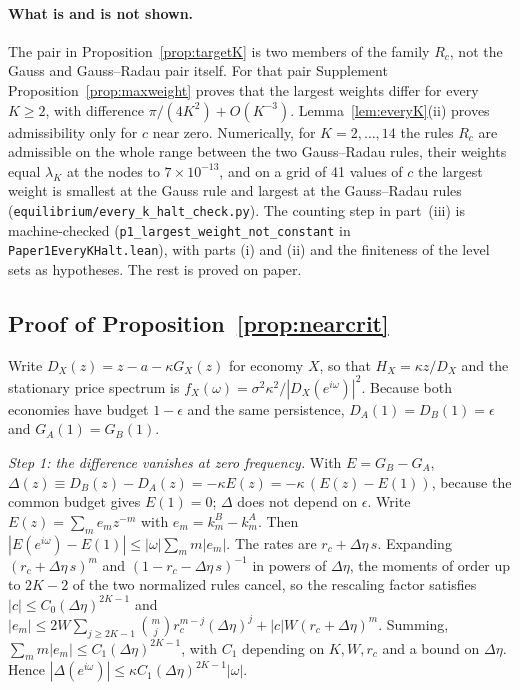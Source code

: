 \documentclass[12pt]{article}
\theoremstyle{definition}
\theoremstyle{remark}
\begin{document}
\paragraph{What is and is not shown.} The pair in Proposition~\ref{prop:targetK} is two members of the family $R_c$, not the Gauss and Gauss--Radau pair itself. For that pair Supplement Proposition~\ref{prop:maxweight} proves that the largest weights differ for every $K\ge2$, with difference $\pi/(4K^2)+O(K^{-3})$. Lemma~\ref{lem:everyK}(ii) proves admissibility only for $c$ near zero. Numerically, for $K=2,\ldots,14$ the rules $R_c$ are admissible on the whole range between the two Gauss--Radau rules, their weights equal $\lambda_K$ at the nodes to $7\times10^{-13}$, and on a grid of 41 values of $c$ the largest weight is smallest at the Gauss rule and largest at the Gauss--Radau rules (\nolinkurl{equilibrium/every_k_halt_check.py}). The counting step in part~(iii) is machine-checked (\texttt{p1\_largest\_weight\_not\_constant} in \nolinkurl{Paper1EveryKHalt.lean}), with parts (i) and (ii) and the finiteness of the level sets as hypotheses. The rest is proved on paper.


\subsection{Proof of Proposition~\ref{prop:nearcrit}}\label{app:nearcrit}

Write $D_X(z)=z-a-\kappa G_X(z)$ for economy $X$, so that $H_X=\kappa z/D_X$ and the stationary price spectrum is $f_X(\omega)=\sigma^2\kappa^2/|D_X(e^{i\omega})|^2$. Because both economies have budget $1-\epsilon$ and the same persistence, $D_A(1)=D_B(1)=\epsilon$ and $G_A(1)=G_B(1)$.

\emph{Step 1: the difference vanishes at zero frequency.} With $E=G_B-G_A$, $\Delta(z)\equiv D_B(z)-D_A(z)=-\kappa E(z)=-\kappa\,(E(z)-E(1))$, because the common budget gives $E(1)=0$; $\Delta$ does not depend on $\epsilon$. Write $E(z)=\sum_me_mz^{-m}$ with $e_m=k^B_m-k^A_m$. Then $|E(e^{i\omega})-E(1)|\le|\omega|\sum_mm|e_m|$. The rates are $r_c+\Delta\eta\,s$. Expanding $(r_c+\Delta\eta\,s)^m$ and $(1-r_c-\Delta\eta\,s)^{-1}$ in powers of $\Delta\eta$, the moments of order up to $2K-2$ of the two normalized rules cancel, so the rescaling factor satisfies $|c|\le C_0(\Delta\eta)^{2K-1}$ and $|e_m|\le2W\sum_{j\ge2K-1}\binom mj r_c^{m-j}(\Delta\eta)^j+|c|W(r_c+\Delta\eta)^m$. Summing, $\sum_mm|e_m|\le C_1(\Delta\eta)^{2K-1}$, with $C_1$ depending on $K,W,r_c$ and a bound on $\Delta\eta$. Hence $|\Delta(e^{i\omega})|\le\kappa C_1(\Delta\eta)^{2K-1}|\omega|$.
\end{document}

